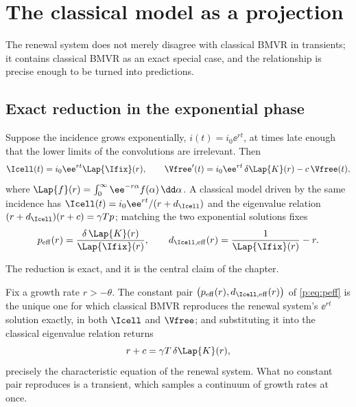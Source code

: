 
\section{The classical model as a projection}
\label{p:sec:projection}

The renewal system does not merely disagree with classical BMVR in
transients; it contains classical BMVR as an exact special case, and the
relationship is precise enough to be turned into predictions.

\subsection{Exact reduction in the exponential phase}

Suppose the incidence grows exponentially, $i(t)=i_0\ee^{rt}$, at times late
enough that the lower limits of the convolutions are irrelevant. Then
\begin{equation}
\Icell(t)=i_0\ee^{rt}\Lap{\Ifix}(r),
\qquad
\Vfree'(t)=i_0\ee^{rt}\,\delta\Lap{K}(r)-c\,\Vfree(t),
\label{p:eq:expphase}
\end{equation}
where $\Lap{f}(r)=\int_0^\infty\ee^{-r\alpha}f(\alpha)\,\dd\alpha$. A
classical model driven by the same incidence has
$\Icell(t)=i_0\ee^{rt}/(r+d_{\Icell})$ and the eigenvalue relation
$(r+d_{\Icell})(r+c)=\gamma Tp$; matching the two exponential solutions
fixes
\begin{equation}
p_{\rm eff}(r)=\frac{\delta\,\Lap{K}(r)}{\Lap{\Ifix}(r)},
\qquad
d_{\Icell,{\rm eff}}(r)=\frac{1}{\Lap{\Ifix}(r)}-r.
\label{p:eq:peff}
\end{equation}

The reduction is exact, and it is the central claim of the chapter.

\begin{theorem}
\label{p:thm:projection}
Fix a growth rate $r>-\theta$. The constant pair
$\bigl(p_{\rm eff}(r),d_{\Icell,{\rm eff}}(r)\bigr)$ of \cref{p:eq:peff} is
the unique one for which classical BMVR reproduces the renewal system's
$\ee^{rt}$ solution exactly, in both $\Icell$ and $\Vfree$; and substituting
it into the classical eigenvalue relation returns
\begin{equation}
r+c=\gamma T\,\delta\Lap{K}(r),
\label{p:eq:char}
\end{equation}
precisely the characteristic equation of the renewal system. What no
constant pair reproduces is a transient, which samples a continuum of growth
rates at once.
\end{theorem}

